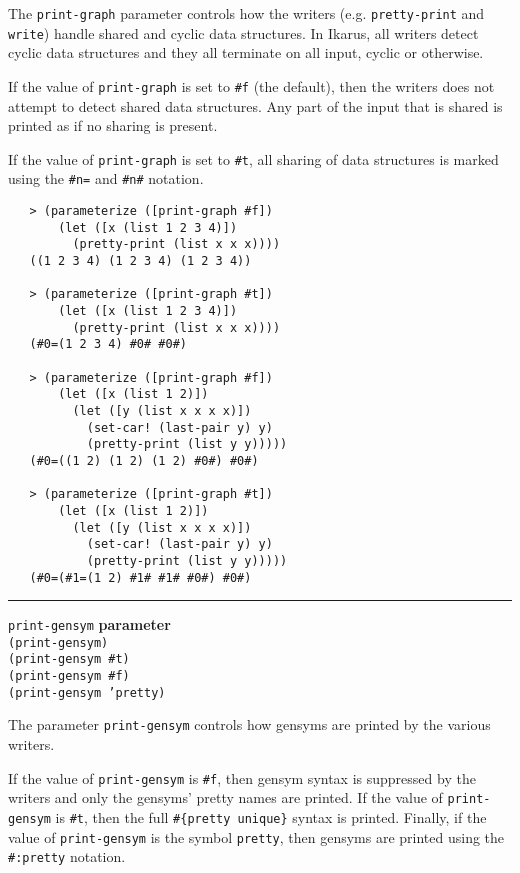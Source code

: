 \documentclass[onecolumn, 12pt, twoside, openright, dvipdfm]{book}
\makeatletter
\newcommand{\idxdefun}[3]{
\vspace{1ex}
\rule{\textwidth}{2pt}
{\index{#1@\texttt{#2}}\label{#1}{\Large\texttt{#2}} \hfill \textbf{#3}}\\
}
\newcommand{\defun}[2]{\idxdefun{#1}{#1}{#2}}
\makeatother
\begin{document}
The \texttt{print-graph} parameter controls how the writers (e.g.
\texttt{pretty-print} and \texttt{write}) handle shared and cyclic
data structures.  In Ikarus, all writers detect cyclic data
structures and they all terminate on all input, cyclic or otherwise.

If the value of \texttt{print-graph} is set to \texttt{\#f} (the
default), then the writers does not attempt to detect shared data
structures.  Any part of the input that is shared is printed as if
no sharing is present.

If the value of \texttt{print-graph} is set to \texttt{\#t}, all
sharing of data structures is marked using the \texttt{\#n=} and
\texttt{\#n\#} notation. 

\begin{verbatim}
   > (parameterize ([print-graph #f])
       (let ([x (list 1 2 3 4)])
         (pretty-print (list x x x))))
   ((1 2 3 4) (1 2 3 4) (1 2 3 4))

   > (parameterize ([print-graph #t])
       (let ([x (list 1 2 3 4)])
         (pretty-print (list x x x))))
   (#0=(1 2 3 4) #0# #0#)

   > (parameterize ([print-graph #f])
       (let ([x (list 1 2)])
         (let ([y (list x x x x)])
           (set-car! (last-pair y) y)
           (pretty-print (list y y)))))
   (#0=((1 2) (1 2) (1 2) #0#) #0#)

   > (parameterize ([print-graph #t])
       (let ([x (list 1 2)])
         (let ([y (list x x x x)])
           (set-car! (last-pair y) y)
           (pretty-print (list y y)))))
   (#0=(#1=(1 2) #1# #1# #0#) #0#)
\end{verbatim}




\defun{print-gensym}{parameter}
\texttt{(print-gensym)}\\
\texttt{(print-gensym \#t)}\\
\texttt{(print-gensym \#f)}\\
\texttt{(print-gensym 'pretty)}

The parameter \texttt{print-gensym} controls how gensyms are printed
by the various writers.  

If the value of \texttt{print-gensym} is \texttt{\#f}, then gensym
syntax is suppressed by the writers and only the gensyms' pretty
names are printed.  If the value of \texttt{print-gensym} is
\texttt{\#t}, then the full \texttt{\#\{pretty~unique\}} syntax is
printed.  Finally, if the value of \texttt{print-gensym} is the
symbol \texttt{pretty}, then gensyms are printed using the
\texttt{\#:pretty} notation.  
\end{document}
